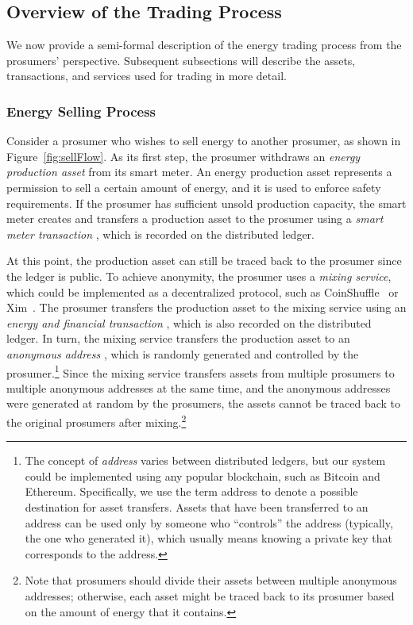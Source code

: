 \subsection{Overview of the Trading Process}
We now provide a semi-formal description of the energy trading process
from the prosumers' perspective. 
Subsequent subsections will describe the assets, transactions, and services used for trading in more detail.  

\subsubsection{Energy Selling Process}
Consider a prosumer who wishes to sell energy to another
prosumer, as shown in Figure~\ref{fig:sellFlow}. 
As its first step, the prosumer withdraws an \emph{energy production asset} from its smart meter.
An energy production asset represents a permission to sell a certain amount of energy, and it is used to enforce safety requirements.
If the prosumer has sufficient unsold production capacity, the smart meter creates and transfers a production asset to the prosumer using a \emph{smart meter transaction} , which is recorded on the distributed ledger.

At this point, the production asset can still be traced back to the prosumer since the ledger is public.
To achieve anonymity, the prosumer uses a \emph{mixing service}, which could be implemented as a decentralized protocol, such as CoinShuffle~\cite{ruffing2014coinshuffle} or Xim~\cite{bissias2014sybil}.
The prosumer transfers the production asset to the mixing service using an \emph{energy and financial transaction} , which is also recorded on the distributed ledger.
In turn, the mixing service
transfers the production asset to an \emph{anonymous address} ,
which is randomly generated and controlled by the
prosumer.\footnote{The concept of \emph{address} varies between distributed ledgers, but our system could be implemented using any popular blockchain, such as Bitcoin and Ethereum. 
Specifically, we use the term address to denote a possible destination for asset transfers. 
Assets that have been transferred to an address can be used only by someone who ``controls'' the address (typically, the one who generated it), which usually means knowing a private key that corresponds to the address.} %
Since the mixing service transfers assets from multiple prosumers to
multiple anonymous addresses at the same time, and the anonymous
addresses were generated at random by the prosumers, the assets
cannot be traced back to the original prosumers after
mixing.\footnote{Note that prosumers should divide their assets between multiple
  anonymous addresses; otherwise, each asset might be traced back to
  its prosumer based on the amount of energy that it contains.}

